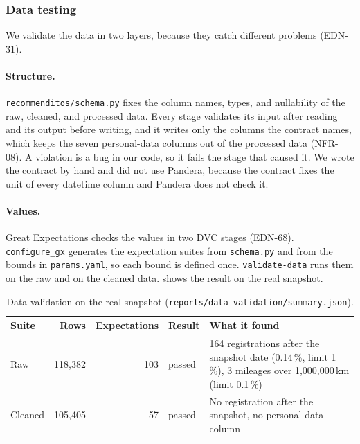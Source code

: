 \subsubsection{Data testing}
\label{sec:m3-data-testing}

We validate the data in two layers, because they catch different problems (EDN-31).

\paragraph{Structure.}
\texttt{recommenditos/schema.py} fixes the column names, types, and nullability of the raw, cleaned, and processed data.
Every stage validates its input after reading and its output before writing, and it writes only the columns the contract names, which keeps the seven personal-data columns out of the processed data (NFR-08).
A violation is a bug in our code, so it fails the stage that caused it.
We wrote the contract by hand and did not use Pandera, because the contract fixes the unit of every datetime column and Pandera does not check it.

\paragraph{Values.}
Great Expectations checks the values in two DVC stages (EDN-68).
\texttt{configure\_gx} generates the expectation suites from \texttt{schema.py} and from the bounds in \texttt{params.yaml}, so each bound is defined once.
\texttt{validate-data} runs them on the raw and on the cleaned data.
 shows the result on the real snapshot.

\begin{table}[ht]
  \centering\small
  \begin{tabularx}{\textwidth}{@{}lrrlX@{}}
    \toprule
    Suite & Rows & Expectations & Result & What it found \\
    \midrule
    Raw & 118,382 & 103 & passed & 164 registrations after the snapshot date (0.14\,\%, limit 1\,\%), 3 mileages over 1,000,000\,km (limit 0.1\,\%) \\
    \addlinespace[2pt]
    Cleaned & 105,405 & 57 & passed & No registration after the snapshot, no personal-data column \\
    \bottomrule
  \end{tabularx}
  \caption{Data validation on the real snapshot (\texttt{reports/data-validation/summary.json}).}
  \label{tab:validation}
\end{table}

